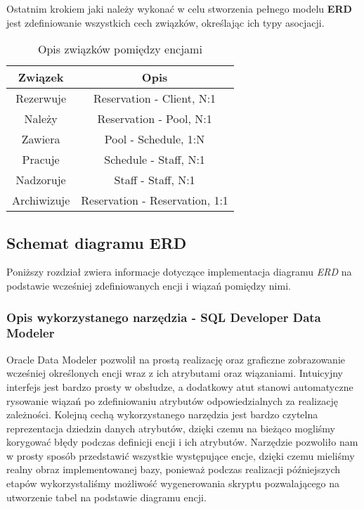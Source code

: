\documentclass[a4paper]{article}
\begin{document}
Ostatnim krokiem jaki należy wykonać w celu stworzenia pełnego modelu \textbf{ERD} jest zdefiniowanie wszystkich cech związków, określając ich typy asocjacji.

\begin{table}[htbp]
\centering
\begin{tabular}{|c|c|}
\hline
\textbf{Związek} & \textbf{Opis}             \\ \hline
Rezerwuje        & Reservation - Client, N:1 \\ \hline
Należy           & Reservation - Pool, N:1   \\ \hline
Zawiera          & Pool - Schedule, 1:N         \\ \hline
Pracuje          & Schedule - Staff, N:1     \\ \hline
Nadzoruje        & Staff - Staff, N:1        \\ \hline
Archiwizuje      & Reservation - Reservation, 1:1 \\ \hline
\end{tabular}
\caption{Opis związków pomiędzy encjami}
\end{table}

\subsection{Schemat diagramu \textbf{ERD}}

Poniższy rozdział zwiera informacje dotyczące implementacja diagramu \textit{ERD} na podstawie wcześniej zdefiniowanych encji i wiązań pomiędzy nimi.

\subsubsection{Opis wykorzystanego narzędzia - SQL Developer Data Modeler}

Oracle Data Modeler pozwolił na prostą realizację oraz graficzne zobrazowanie wcześniej określonych encji wraz z ich atrybutami oraz wiązaniami. Intuicyjny interfejs jest bardzo prosty w obsłudze, a dodatkowy atut stanowi automatyczne rysowanie wiązań po zdefiniowaniu atrybutów odpowiedzialnych za realizację zależności. Kolejną cechą wykorzystanego narzędzia jest bardzo czytelna reprezentacja dziedzin danych atrybutów, dzięki czemu na bieżąco mogliśmy korygować błędy podczas definicji encji i ich atrybutów. Narzędzie pozwoliło nam w prosty sposób przedstawić wszystkie występujące encje, dzięki czemu mieliśmy realny obraz implementowanej bazy, ponieważ podczas realizacji późniejszych etapów wykorzystaliśmy możliwość wygenerowania skryptu pozwalającego na utworzenie tabel na podstawie diagramu encji.
\end{document}
